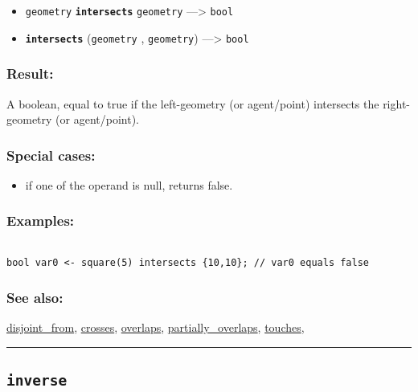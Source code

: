 \documentclass[]{book}
\providecommand{\tightlist}{%
  \setlength{\itemsep}{0pt}\setlength{\parskip}{0pt}}
\theoremstyle{definition}
\theoremstyle{definition}
\theoremstyle{definition}
\theoremstyle{remark}
\begin{document}
\begin{itemize}
\tightlist
\item
  \texttt{geometry} \textbf{\texttt{intersects}} \texttt{geometry}
  ---\textgreater{} \texttt{bool}
\item
  \textbf{\texttt{intersects}} (\texttt{geometry} , \texttt{geometry})
  ---\textgreater{} \texttt{bool}
\end{itemize}

\subsubsection{Result:}\label{result-272}

A boolean, equal to true if the left-geometry (or agent/point)
intersects the right-geometry (or agent/point).

\subsubsection{Special cases:}\label{special-cases-81}

\begin{itemize}
\tightlist
\item
  if one of the operand is null, returns false.
\end{itemize}

\subsubsection{Examples:}\label{examples-212}

\begin{verbatim}
 
bool var0 <- square(5) intersects {10,10}; // var0 equals false
\end{verbatim}

\subsubsection{See also:}\label{see-also-121}

\href{OperatorsDH\#disjoint_from}{disjoint\_from},
\href{OperatorsBC\#crosses}{crosses},
\href{OperatorsNR\#overlaps}{overlaps},
\href{OperatorsNR\#partially_overlaps}{partially\_overlaps},
\href{OperatorsSZ\#touches}{touches},

\begin{center}\rule{0.5\linewidth}{\linethickness}\end{center}

\subsection{\texorpdfstring{\texttt{inverse}}{inverse}}\label{inverse}
\end{document}
